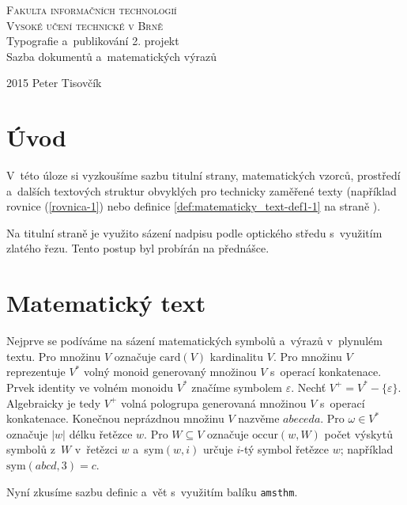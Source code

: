 \documentclass[11pt, a4paper, twocolumn, titlepage] {article}
\theoremstyle{definition}
\begin{document}
\begin{titlepage}
\begin{center}
	\Huge
	\textsc{Fakulta informačních technologií\\Vysoké učení technické v Brně}\\
	\Large Typografie a~publikování\,\textendash\,2. projekt\\
	Sazba dokumentů a~matematických výrazů
\end{center}
{\LARGE 2015 \hfill Peter Tisovčík}
\end{titlepage}
	

\section*{Úvod}
V~této úloze si vyzkoušíme sazbu titulní strany, matematických vzorců, prostředí a~dalších textových struktur obvyklých pro technicky zaměřené texty (například rovnice (\ref{rovnica-1}) nebo definice \ref{def:matematicky_text-def1-1} na straně \pageref{def:matematicky_text-def1-1}).

Na titulní straně je využito sázení nadpisu podle optického středu s~využitím zlatého řezu. Tento postup byl probírán na přednášce.

\section{Matematický text}
Nejprve se podíváme na sázení matematických symbolů a~výrazů v~plynulém textu. Pro množinu $V$ označuje $\mathrm{card}(V)$ kardinalitu $V$.
Pro množinu $V$ reprezentuje $V^*$ volný monoid generovaný množinou $V$ s~operací konkatenace.
Prvek identity ve volném monoidu $V^*$ značíme symbolem $\varepsilon$.
Nechť $V^+ = V^* - \{\varepsilon\}$. Algebraicky je tedy $V^+$ volná pologrupa generovaná množinou $V$ s~operací konkatenace.
Konečnou neprázdnou množinu $V$ nazvěme $abeceda$.
Pro $\omega \in V^*$ označuje $|w|$ délku řetězce $w$. Pro $W \subseteq V$ označuje $\mathrm{occur}(w,W)$ počet výskytů symbolů z~$W$ v~řetězci $w$ a~sym$(w, i)$ určuje $i$-tý symbol řetězce $w$; například $\mathrm{sym}(abcd,3) = c$.

Nyní zkusíme sazbu definic a~vět s~využitím balíku \verb|amsthm|.
\end{document}
